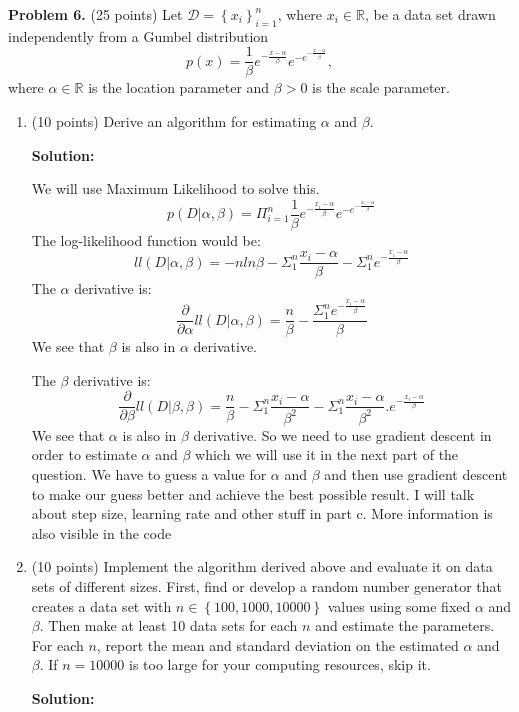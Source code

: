 \documentclass[twoside]{article}
\begin{document}

\textbf{Problem 6.} (25 points) Let $\mathcal{D}=\left\{ x_{i}\right\} _{i=1}^{n}$, where $x_i \in \mathbb{R}$, be a data set drawn independently from a Gumbel distribution
\[
p(x)=\frac{1}{\beta}e^{-\frac{x-\alpha}{\beta}}e^{-e^{-\frac{x-\alpha}{\beta}}},
\]
where $\alpha\in\mathbb{R}$ is the location parameter and $\beta>0$ is the scale parameter. 
\begin{enumerate}
\item (10 points) Derive an algorithm for estimating $\alpha$ and $\beta$.

\textbf{Solution:}

We will use Maximum Likelihood to solve this.
\[
p(D|\alpha, \beta) = \Pi_{i=1}^{n}{\frac{1}{\beta}e^{-\frac{x_i-\alpha}{\beta}}e^{-e^{-\frac{x_i-\alpha}{\beta}}}}
\]
The log-likelihood function would be:
\[
ll(D|\alpha, \beta) = -n ln\beta - \Sigma_1^n{\frac{x_i - \alpha}{\beta}} - \Sigma_1^n{e^{-\frac{x_i - \alpha}{\beta}}}
\]
The $\alpha$ derivative is:
\[
\frac{\partial}{\partial \alpha} ll(D|\alpha, \beta) = 
\frac{n}{\beta} - \frac{\Sigma_1^n{e^{-\frac{x_i - \alpha}{\beta}}}}{\beta}
\]
We see that $\beta$ is also in $\alpha$ derivative.

The $\beta$ derivative is:
\[
\frac{\partial}{\partial \beta} ll(D|\beta, \beta) = 
\frac{n}{\beta} - \Sigma_1^n{\frac{x_i - \alpha}{\beta^2}} - \Sigma_1^n{\frac{x_i - \alpha}{\beta^2} . e^{-\frac{x_i - \alpha}{\beta}}}
\]
We see that $\alpha$ is also in $\beta$ derivative.
So we need to use gradient descent in order to estimate $\alpha$ and $\beta$ which we will use it in the next part of the question. We have to guess a value for $\alpha$ and $\beta$ and then use gradient descent to make our guess better and achieve the best possible result. I will talk about step size, learning rate and other stuff in part c. More information is also visible in the code


\item (10 points) Implement the algorithm derived above and evaluate it on data sets of different sizes. First, find or develop a random number generator that creates a data set with $n \in \left\{ 100, 1000, 10000 \right\}$ values using some fixed $\alpha$ and $\beta$. Then make at least 10 data sets for each $n$ and estimate the parameters. For each $n$, report the mean and standard deviation on the estimated $\alpha$ and $\beta$. If $n=10000$ is too large for your computing resources, skip it.

\textbf{Solution:}


\end{enumerate}
\end{document}
